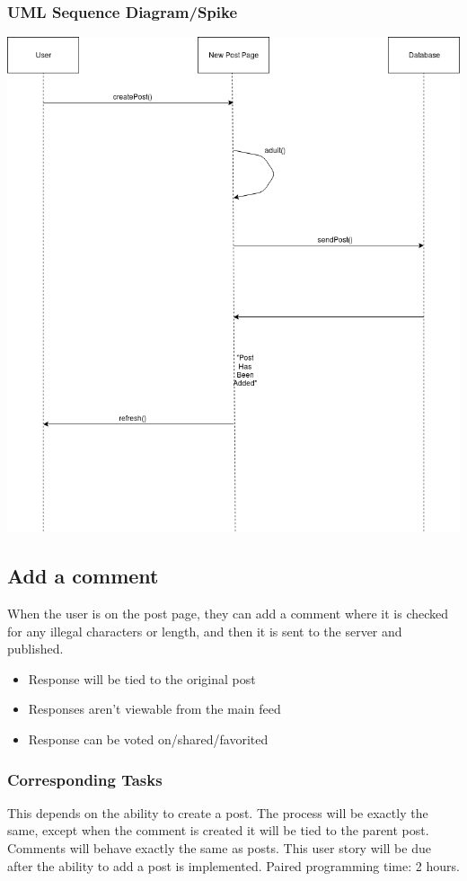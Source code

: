 \documentclass[12pt]{article}
\begin{document}
\subsubsection{UML Sequence Diagram/Spike}
\includegraphics[scale=0.5]{img/story_1.png}\linebreak


\subsection{Add a comment}
When the user is on the post page, they can add a comment where it is checked
for any illegal characters or length, and then it is sent to the server and
published.
\begin{itemize}
  \item Response will be tied to the original post
  \item Responses aren’t viewable from the main feed
  \item Response can be voted on/shared/favorited
\end{itemize}
\subsubsection{Corresponding Tasks}
	This depends on the ability to create a post.  The process will be exactly the same, except when the comment is created it will be tied to the parent post.  Comments will behave exactly the same as posts.  This user story will be due after the ability to add a post is implemented.  Paired programming time: 2 hours.
\end{document}
